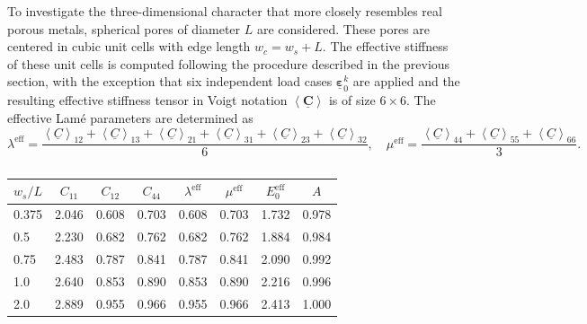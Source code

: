 \documentclass[pdflatex,sn-mathphys-num]{sn-jnl}%
\theoremstyle{thmstyleone}%
\theoremstyle{thmstyletwo}%
\theoremstyle{thmstylethree}%
\begin{document}
To investigate the three-dimensional character that more closely resembles real porous metals, spherical pores of diameter $L$ are considered. These pores are centered in cubic unit cells with edge length $w_c = w_s + L$. The effective stiffness of these unit cells is computed following the procedure described in the previous section, with the exception that six independent load cases $\underline{\boldsymbol{\varepsilon}}_0^k$ are applied and the resulting effective stiffness tensor in Voigt notation 
$\left< \underline{\boldsymbol{C}} \right>$ is of size $6\times6$.  The effective Lam\'e parameters  are determined as
\begin{equation}
    \lambda^{\text{eff}} = \dfrac{\left< \underline{C} \right>_{12} + \left< \underline{C} \right>_{13} + \left< \underline{C} \right>_{21} + \left< \underline{C} \right>_{31} + \left< \underline{C} \right>_{23} + \left< \underline{C} \right>_{32}}{6}, \quad
    \mu^{\text{eff}} = \dfrac{\left< \underline{C} \right>_{44} + \left< \underline{C} \right>_{55} + \left< \underline{C} \right>_{66}}{3}.
\end{equation}
\begin{table}[htb]
\centering
\caption{}
\label{tab:effective_stiffness_3D}
\begin{tabular}{lccccccc}
\toprule
$w_s/L$ & $C_{11}$ & $C_{12}$ & $C_{44}$ & $\lambda^{\text{eff}}$ & $\mu^{\text{eff}}$ & $E_0^{\text{eff}}$ & $A$ \\
\midrule
0.375 & 2.046 & 0.608 & 0.703 & 0.608 & 0.703 & 1.732 & 0.978 \\
0.5   & 2.230 & 0.682 & 0.762 & 0.682 & 0.762 & 1.884 & 0.984 \\
0.75  & 2.483 & 0.787 & 0.841 & 0.787 & 0.841 & 2.090 & 0.992 \\
1.0   & 2.640 & 0.853 & 0.890 & 0.853 & 0.890 & 2.216 & 0.996 \\
2.0   & 2.889 & 0.955 & 0.966 & 0.955 & 0.966 & 2.413 & 1.000 \\
\bottomrule
\end{tabular}
\end{table}
\end{document}
